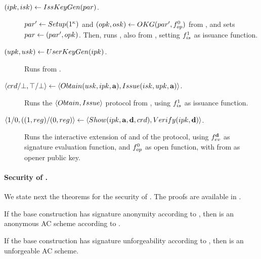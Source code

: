 \begin{description}
\item[$(ipk,isk) \gets IssKeyGen(par)$.] $par' \gets
  Setup(1^\kappa)$ and $(opk,osk) \gets OKG(par',
  f_{op}^0)$ from \CUASGen, and sets $par \gets (par',opk)$. Then,
  runs \IKeyGen, also from \CUASGen, setting $f_{is}^1$ as issuance function.
\item[$(upk,usk) \gets UserKeyGen(ipk)$.] Runs \UKeyGen from \CUASGen.
\item[$\langle crd/\bot,\top/\bot \rangle \gets
  \langle Obtain(usk,ipk,\mathbf{a}),Issue(isk,upk,\mathbf{a}) \rangle$.]
  Runs the $\langle Obtain,Issue \rangle$ protocol from \CUASGen, using
  $f_{is}^1$ as issuance function.
\item[$\langle 1/0,((1,reg)/(0,reg)\rangle
  \gets \langle Show(ipk,\mathbf{a},\mathbf{d},
  crd),Verify(ipk,\mathbf{d}) \rangle$.]
  Runs the interactive extension of \Sign and \Verify of the \CUASGen protocol,
  using $f_{ev}^{\mathbf{d}}$ as signature evaluation function, and $f_{op}^0$ as
  open function, with \opk from \parm as opener public key.
\end{description}

\paragraph{Security of \CUASAC.} %
We state next the theorems for the security of \CUASAC. The proofs are
available in .

\begin{theorem}
  \label{thm:anon-cuasac}
  If the base \CUASGen construction has signature anonymity according to
  , then \CUASAC is an anonymous AC scheme
  according to \cite{fhs19}.
\end{theorem}

\begin{theorem}
  \label{thm:forge-cuasac}
  If the base \CUASGen construction has signature unforgeability according to
  , then \CUASAC is an unforgeable AC scheme.
\end{theorem}

